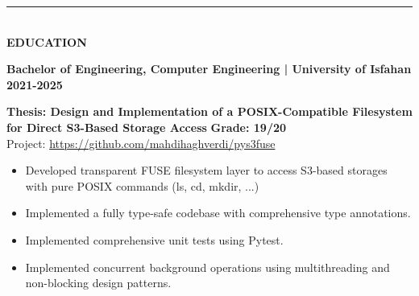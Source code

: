 \documentclass[10pt, dvipsnames, svgnames, x11names]{article}
\begin{document}
\noindent\textcolor{DarkBlue}{\rule{\textwidth}{0.05mm}} \vspace{-1mm} \\
{\LARGE \textbf{EDUCATION}}

\noindent \textbf{Bachelor of Engineering, Computer Engineering | University of Isfahan} \hfill \textbf{2021-2025}

\noindent \textbf{Thesis: Design and Implementation of a POSIX-Compatible Filesystem for Direct S3-Based Storage Access} \hfill \textbf{Grade: 19/20} \\
Project: \href{https://github.com/mahdihaghverdi/pys3fuse}{https://github.com/mahdihaghverdi/pys3fuse}
\begin{itemize}[nosep]
\item Developed transparent FUSE filesystem layer to access S3-based storages with pure POSIX commands (ls, cd, mkdir, ...)
\item Implemented a fully type-safe codebase with comprehensive type annotations.
\item Implemented comprehensive unit tests using Pytest.
\item Implemented concurrent background operations using multithreading and non-blocking design patterns.
\end{itemize}
\end{document}
